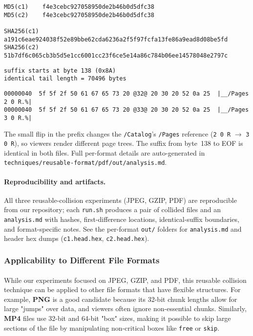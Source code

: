 \documentclass[runningheads]{llncs}
\begin{document}
    \begin{lstlisting}[style=textblock, caption={Hashes for the reusable PDF pair}, label={lst:pdfhashes}]
MD5(c1)    f4e3cebc927058950de2b46b0d5dfc38
MD5(c2)    f4e3cebc927058950de2b46b0d5dfc38

SHA256(c1) a191c6eae924038f52e89bbe62cda6236a2f5f97fcfa13fe86a9ead8d08be5fd
SHA256(c2) 51b7df6c065cb3b5d5e1cc6001cc23f6ce5e14a86c784b06ee14578048e2797c
    \end{lstlisting}

    \begin{lstlisting}[style=textblock, caption={Identical suffix boundary}, label={lst:pdf-suffix}]
suffix starts at byte 138 (0x8A)
identical tail length = 70496 bytes
    \end{lstlisting}

    \begin{lstlisting}[style=hexhi, caption={GZIP prefix excerpt (visible flip)}, label={lst:gziphex}]
00000040  5f 5f 2f 50 61 67 65 73 20 @32@ 20 30 20 52 0a 25  |__/Pages 2 0 R.%|
00000040  5f 5f 2f 50 61 67 65 73 20 @33@ 20 30 20 52 0a 25  |__/Pages 3 0 R.%|
    \end{lstlisting}

    \textit{} The small flip in the prefix changes the \texttt{/Catalog}’s \texttt{/Pages} reference (\texttt{2 0 R} $\rightarrow$ \texttt{3 0 R}), so viewers render different page trees. The suffix from byte~138 to EOF is identical in both files. Full per-format details are auto-generated in \texttt{techniques/reusable-format/pdf/out/analysis.md}.


    \paragraph{Reproducibility and artifacts.}
    All three reusable-collision experiments (JPEG, GZIP, PDF) are reproducible from our repository; each \texttt{run.sh} produces a pair of collided files and an \texttt{analysis.md} with hashes, first-difference locations, identical-suffix boundaries, and format-specific notes. See the per-format \texttt{out/} folders for \texttt{analysis.md} and header hex dumps (\texttt{c1.head.hex}, \texttt{c2.head.hex}).

    \subsubsection{Applicability to Different File Formats}

    \paragraph{}
    While our experiments focused on JPEG, GZIP, and PDF, this reusable collision technique can be applied to other file formats that have flexible structures. For example, \textbf{PNG} is a good candidate because its 32-bit chunk lengths allow for large "jumps" over data, and viewers often ignore non-essential chunks. Similarly, \textbf{MP4} files use 32-bit and 64-bit "box" sizes, making it possible to skip large sections of the file by manipulating non-critical boxes like \texttt{free} or \texttt{skip}.
\end{document}
